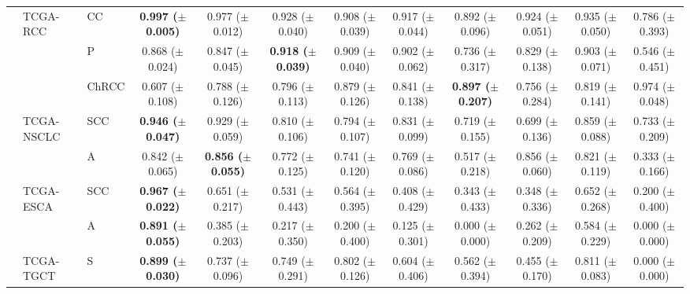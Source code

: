 \documentclass[10pt,twocolumn,letterpaper]{article}
\begin{document}
\begin{table}[!ht]
{{\begin{tabular}{lllcc|ccccc|cc}
                & TCGA-RCC         & CC  & \textbf{0.997 ($\pm$0.005)}  & 0.977 ($\pm$0.012)           & 0.928 ($\pm$0.040)          & 0.908 ($\pm$0.039)          & 0.917 ($\pm$0.044)          & 0.892 ($\pm$0.096)          & 0.924 ($\pm$0.051)          & 0.935 ($\pm$0.050)  & 0.786 ($\pm$0.393)    \\
                &                  & P& 0.868 ($\pm$0.024)           & 0.847 ($\pm$0.045)           & \textbf{0.918 ($\pm$0.039)} & 0.909 ($\pm$0.040)          & 0.902 ($\pm$0.062)          & 0.736 ($\pm$0.317)          & 0.829 ($\pm$0.138)          & 0.903 ($\pm$0.071)  & 0.546 ($\pm$0.451)    \\
                &                  & ChRCC & 0.607 ($\pm$0.108)           & 0.788 ($\pm$0.126)           & 0.796 ($\pm$0.113)          & 0.879 ($\pm$0.126)          & 0.841 ($\pm$0.138)          & \textbf{0.897 ($\pm$0.207)} & 0.756 ($\pm$0.284)          & 0.819 ($\pm$0.141)  & 0.974 ($\pm$0.048)    \\
                & TCGA-NSCLC       & SCC          & \textbf{0.946 ($\pm$0.047)}  & 0.929 ($\pm$0.059)           & 0.810 ($\pm$0.106)          & 0.794 ($\pm$0.107)          & 0.831 ($\pm$0.099)          & 0.719 ($\pm$0.155)          & 0.699 ($\pm$0.136)          & 0.859 ($\pm$0.088)  & 0.733 ($\pm$0.209)    \\
                &                  & A                   & 0.842 ($\pm$0.065)           & \textbf{0.856 ($\pm$0.055)}  & 0.772 ($\pm$0.125)          & 0.741 ($\pm$0.120)          & 0.769 ($\pm$0.086)          & 0.517 ($\pm$0.218)          & 0.856 ($\pm$0.060)          & 0.821 ($\pm$0.119)  & 0.333 ($\pm$0.166)    \\
                & TCGA-ESCA        & SCC          & \textbf{0.967 ($\pm$0.022)}  & 0.651 ($\pm$0.217)           & 0.531 ($\pm$0.443)          & 0.564 ($\pm$0.395)          & 0.408 ($\pm$0.429)          & 0.343 ($\pm$0.433)          & 0.348 ($\pm$0.336)          & 0.652 ($\pm$0.268)  & 0.200 ($\pm$0.400)    \\
                &                  & A                   & \textbf{0.891 ($\pm$0.055)}  & 0.385 ($\pm$0.203)           & 0.217 ($\pm$0.350)          & 0.200 ($\pm$0.400)          & 0.125 ($\pm$0.301)          & 0.000 ($\pm$0.000)          & 0.262 ($\pm$0.209)          & 0.584 ($\pm$0.229)  & 0.000 ($\pm$0.000)    \\
                & TCGA-TGCT        & S & \textbf{0.899 ($\pm$0.030)}  & 0.737 ($\pm$0.096)           & 0.749 ($\pm$0.291)          & 0.802 ($\pm$0.126)          & 0.604 ($\pm$0.406)          & 0.562 ($\pm$0.394)          & 0.455 ($\pm$0.170)          & 0.811 ($\pm$0.083)  & 0.000 ($\pm$0.000)    \\

\end{tabular}}}
\end{table}
\end{document}
